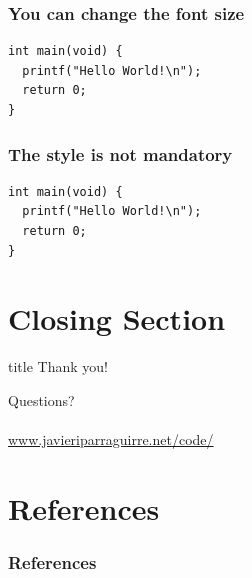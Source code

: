 \documentclass[]{beamer}
\begin{document}
\begin{frame}[fragile]
  \frametitle{You can change the font size}
  \lstset{basicstyle=\Large,style=myC++Style}  
  \begin{lstlisting}
int main(void) {
  printf("Hello World!\n");
  return 0;
}
  \end{lstlisting}
\end{frame}

\begin{frame}[fragile]
  \frametitle{The style is not mandatory}
  \lstset{}
  \begin{lstlisting}
int main(void) {
  printf("Hello World!\n");
  return 0;
}
  \end{lstlisting}
\end{frame}

\section{Closing Section}
\begin{frame}  
  \begin{center}
  \begin{beamercolorbox}[sep=8pt,center]{title}
    \Large{Thank you!}
    \end{beamercolorbox}
    \huge{Questions?}\\
    \small{\email}\\
    \small{\url{www.javieriparraguirre.net/code/}}
  \end{center}
\end{frame}

{
\section{References}
\begin{frame}[allowframebreaks]
  \frametitle{References}
  
  
\end{frame}
}
\end{document}
